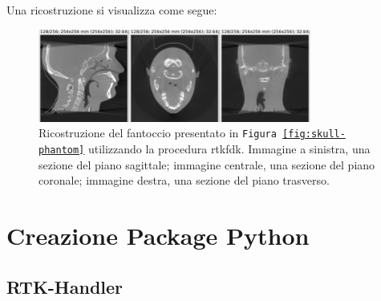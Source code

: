 \documentclass[a4paper,12pt, doubleside]{report}
\begin{document}
                    Una ricostruzione si visualizza come segue:
                    
                    \begin{figure}[h]
                        
                        \centering
                        \includegraphics[width=0.8\textwidth]{reconstruction}
                        \caption{Ricostruzione del fantoccio presentato in \texttt{Figura \ref{fig:skull-phantom}}
                        utilizzando la procedura rtkfdk. Immagine a sinistra, una sezione del piano sagittale; immagine centrale, una sezione del piano coronale; immagine destra, una sezione del piano trasverso. }
                        \label{fig:reconstruction}
                        
                    \end{figure}
            
            
            
    \chapter{Creazione Package Python}
        \section{RTK-Handler}
\end{document}
